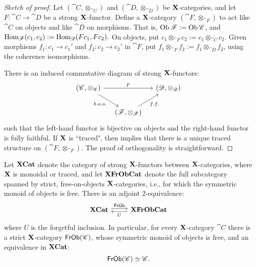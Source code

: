 \documentclass[12pt,oneside,article,draft]{memoir}
\begin{document}
\begin{proof}[Sketch of proof]

Let $(\cat{C},\otimes_{\cat{C}})$ and $(\cat{D},\otimes_{\cat{D}})$ be $\mathbf{X}$-categories, and let $F\colon\cat{C}\to\cat{D}$ be a strong $\mathbf{X}$-functor. Define a $\mathbf{X}$-category $(\cat{F},\otimes_{\cat{F}})$ to act like $\cat{C}$ on objects and like $\cat{D}$ on morphisms. That is, $\operatorname{Ob}\mathscr{F}:=\operatorname{Ob}\mathscr{C}$, and $\operatorname{Hom}_{\mathscr{F}}(c_1,c_2):=\operatorname{Hom}_{\mathscr{D}}(Fc_1,Fc_2).$ On objects, put $c_1\otimes_{\cat{F}}c_2:=c_1\otimes_{\cat{C}}c_2$. Given morphisms $f_1\colon c_1\to c_1'$ and $f_2\colon c_2\to c_2'$ in $\cat{F}$, put $f_1\otimes_{\cat{F}}f_2:=f_1\otimes_{\cat{D}}f_2$, using the coherence isomorphisms.

There is an induced commutative diagram of strong $\mathbf{X}$-functors:
$$
\begin{tikzcd}[column sep=small]
(\cat{C},\otimes_{\cat{C}})\arrow[dr, "b.o.o."']\arrow[rr, "F"]&&(\cat{D},\otimes_{\cat{D}})\\
&(\cat{F},\otimes_{\cat{F}})\arrow[ur,"f.f."']
\end{tikzcd}
$$
such that the left-hand functor is bijective on objects and the right-hand functor is fully faithful. If $\mathbf{X}$ is ``traced", then \cite[Proposition 2.4]{Joyal-Street-Vertity} implies that there is a unique traced structure on $(\cat{F},\otimes_{\cat{F}})$. The proof of orthogonality is straightforward.

\end{proof}

\begin{proposition}\label{prop:free objects}

Let $\mathbf{XCat}$ denote the category of strong $\mathbf{X}$-functors between $\mathbf{X}$-categories,  where $\mathbf{X}$ is monoidal or traced, and let $\mathbf{XFrObCat}$ denote the full subcategory spanned by strict, free-on-objects $\mathbf{X}$-categories, i.e., for which the symmetric monoid of objects is free. There is an adjoint 2-equivalence:
$$
\begin{tikzcd}
\Cat{XCat}\arrow[r, shift left=.5ex, "\Fun{FrOb}"]&\Cat{XFrObCat}\arrow[l, shift left=.5ex,"U"]
\end{tikzcd}
$$
where $U$ is the forgetful inclusion. In particular, for every $\mathbf{X}$-category $\cat{C}$ there is a strict $\mathbf{X}$-category $\mathsf{FrOb}(\mathscr{C})$, whose symmetric monoid of objects is free, and an equivalence in $\mathbf{XCat}$:
$$\mathsf{FrOb}(\mathscr{C})\simeq\mathscr{C}.$$

\end{proposition}
\end{document}
